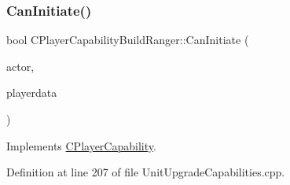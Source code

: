 \subsubsection{\texorpdfstring{Can\+Initiate()}{CanInitiate()}}
{\footnotesize\ttfamily bool C\+Player\+Capability\+Build\+Ranger\+::\+Can\+Initiate (\begin{DoxyParamCaption}\item[{std\+::shared\+\_\+ptr$<$ \hyperlink{classCPlayerAsset}{C\+Player\+Asset} $>$}]{actor,  }\item[{std\+::shared\+\_\+ptr$<$ \hyperlink{classCPlayerData}{C\+Player\+Data} $>$}]{playerdata }\end{DoxyParamCaption})\hspace{0.3cm}{\ttfamily [virtual]}}



Implements \hyperlink{classCPlayerCapability_aa83b1e1fcaff2985c378132d679154ea}{C\+Player\+Capability}.



Definition at line 207 of file Unit\+Upgrade\+Capabilities.\+cpp.


